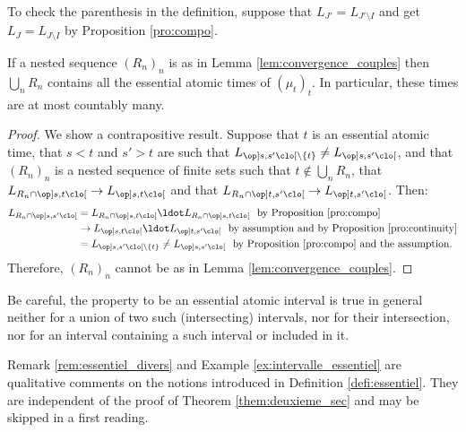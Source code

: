 To check the parenthesis in the definition, suppose that $L_{J'}= L_{J'\setminus I}$ and get $L_{J}= L_{J\setminus I}$ by Proposition \ref{pro:compo}.

\begin{pro}\label{pro:denombrable}If a nested sequence $(R_n)_n$ is as in Lemma \ref{lem:convergence_couples} then $\bigcup_nR_n$ contains all the essential atomic times of $(\mu_t)_t$. In particular, these times are at most countably many.
\end{pro}

\begin{proof}We show a contrapositive result. Suppose that $t$ is an essential atomic time, that $s<t$ and $s'>t$ are such that $L_{\op]s,s'\clo[\setminus\{t\}}\neq L_{\op]s,s'\clo[}$, and that $(R_n)_n$ is a nested sequence of finite sets such that $t\not\in\bigcup_nR_n$, that $L_{R_n\cap\op]s,t\clo[}\to L_{\op]s,t\clo[}$ and that $L_{R_n\cap\op]t,s'\clo[}\to L_{\op]t,s'\clo[}$. Then:
\begin{align*}
L_{R_n\cap\op]s,s'\clo[}&=L_{R_n\cap\op]s,t\clo[}{}\ldot L_{R_n\cap\op]s,t\clo[}\ \ \text{by Proposition \ref{pro:compo}}\\
&\to L_{\op]s,t\clo[}{}\ldot L_{\op]t,s'\clo[}\ \ \text{by assumption and by Proposition \ref{pro:continuity}}\\
&=L_{\op]s,s'\clo[\setminus\{t\}}\neq L_{\op]s,s'\clo[}\ \ \text{by Proposition \ref{pro:compo} and the assumption}.
\end{align*}
Therefore, $(R_n)_n$ cannot be as in Lemma \ref{lem:convergence_couples}.
\end{proof}

\begin{rem}\label{rem:intervalles_essentiels} Be careful, the property to be an essential atomic interval is true in general neither for a union of two such (intersecting) intervals, nor for their intersection, nor for an interval containing a such interval or included in it.
\end{rem}

Remark \ref{rem:essentiel_divers} and Example \ref{ex:intervalle_essentiel} are qualitative comments on the notions introduced in Definition \ref{defi:essentiel}. They are independent of the proof of Theorem \ref{them:deuxieme_sec} and may be skipped in a first reading.

